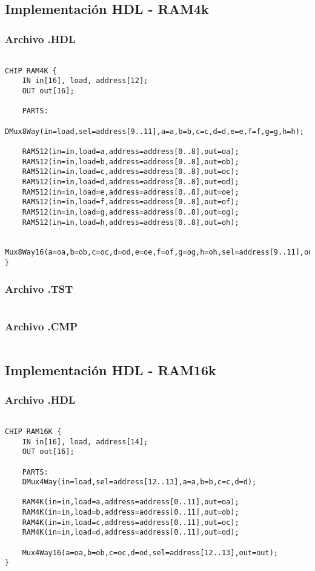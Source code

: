 \documentclass[12pt]{article}
\begin{document}
	\subsection{Implementación HDL - RAM4k}

  	\subsubsection{Archivo .HDL}
  	\begin{lstlisting}

CHIP RAM4K {
	IN in[16], load, address[12];
	OUT out[16];

	PARTS:
	DMux8Way(in=load,sel=address[9..11],a=a,b=b,c=c,d=d,e=e,f=f,g=g,h=h);

	RAM512(in=in,load=a,address=address[0..8],out=oa);
	RAM512(in=in,load=b,address=address[0..8],out=ob);
	RAM512(in=in,load=c,address=address[0..8],out=oc);
	RAM512(in=in,load=d,address=address[0..8],out=od);
	RAM512(in=in,load=e,address=address[0..8],out=oe);
	RAM512(in=in,load=f,address=address[0..8],out=of);
	RAM512(in=in,load=g,address=address[0..8],out=og);
	RAM512(in=in,load=h,address=address[0..8],out=oh);

	Mux8Way16(a=oa,b=ob,c=oc,d=od,e=oe,f=of,g=og,h=oh,sel=address[9..11],out=out);
}

  	\end{lstlisting}
  	\subsubsection{Archivo .TST}
  	\begin{lstlisting}

  	\end{lstlisting}
  	\subsubsection{Archivo .CMP}
  	\begin{lstlisting}

  	\end{lstlisting}
  	    \subsection{Implementación HDL - RAM16k}

  	\subsubsection{Archivo .HDL}
  	\begin{lstlisting}

CHIP RAM16K {
	IN in[16], load, address[14];
	OUT out[16];

	PARTS:
	DMux4Way(in=load,sel=address[12..13],a=a,b=b,c=c,d=d);

	RAM4K(in=in,load=a,address=address[0..11],out=oa);
	RAM4K(in=in,load=b,address=address[0..11],out=ob);
	RAM4K(in=in,load=c,address=address[0..11],out=oc);
	RAM4K(in=in,load=d,address=address[0..11],out=od);

	Mux4Way16(a=oa,b=ob,c=oc,d=od,sel=address[12..13],out=out);
}

  	\end{lstlisting}
\end{document}
